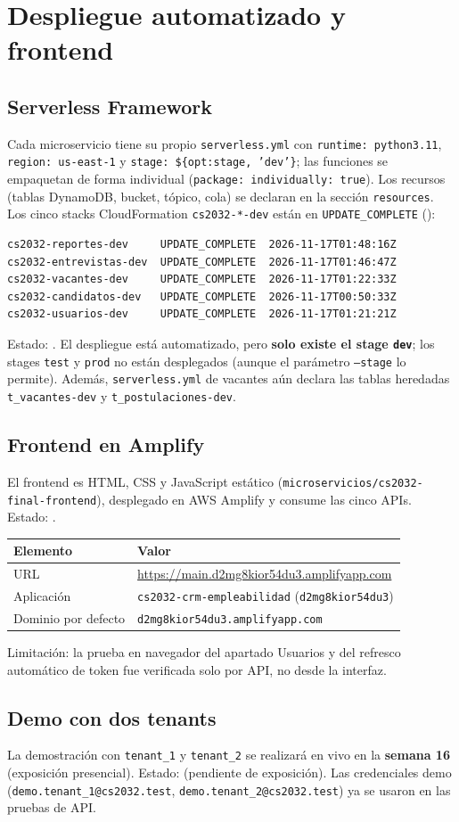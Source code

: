 \section{Despliegue automatizado y frontend}
\subsection{Serverless Framework}
Cada microservicio tiene su propio \texttt{serverless.yml} con \texttt{runtime: python3.11}, \texttt{region: us-east-1} y \texttt{stage: \$\{opt:stage, 'dev'\}}; las funciones se empaquetan de forma individual (\texttt{package: individually: true}). Los recursos (tablas DynamoDB, bucket, tópico, cola) se declaran en la sección \texttt{resources}. Los cinco stacks CloudFormation \texttt{cs2032-*-dev} están en \texttt{UPDATE\_COMPLETE} ():
\begin{lstlisting}
cs2032-reportes-dev     UPDATE_COMPLETE  2026-11-17T01:48:16Z
cs2032-entrevistas-dev  UPDATE_COMPLETE  2026-11-17T01:46:47Z
cs2032-vacantes-dev     UPDATE_COMPLETE  2026-11-17T01:22:33Z
cs2032-candidatos-dev   UPDATE_COMPLETE  2026-11-17T00:50:33Z
cs2032-usuarios-dev     UPDATE_COMPLETE  2026-11-17T01:21:21Z
\end{lstlisting}
Estado: \parcial. El despliegue está automatizado, pero \textbf{solo existe el stage \texttt{dev}}; los stages \texttt{test} y \texttt{prod} no están desplegados (aunque el parámetro \texttt{--stage} lo permite). Además, \texttt{serverless.yml} de vacantes aún declara las tablas heredadas \texttt{t\_vacantes-dev} y \texttt{t\_postulaciones-dev}.

\subsection{Frontend en Amplify}
El frontend es HTML, CSS y JavaScript estático (\texttt{microservicios/cs2032-final-frontend}), desplegado en AWS Amplify y consume las cinco APIs. Estado: \cumple.

\begin{tabular}{@{}ll@{}}
\toprule
Elemento & Valor \\
\midrule
URL & \url{https://main.d2mg8kior54du3.amplifyapp.com} \\
Aplicación & \texttt{cs2032-crm-empleabilidad} (\texttt{d2mg8kior54du3}) \\
Dominio por defecto & \texttt{d2mg8kior54du3.amplifyapp.com} \\
\bottomrule
\end{tabular}

Limitación: la prueba en navegador del apartado Usuarios y del refresco automático de token fue verificada solo por API, no desde la interfaz.

\subsection{Demo con dos tenants}
La demostración con \texttt{tenant\_1} y \texttt{tenant\_2} se realizará en vivo en la \textbf{semana 16} (exposición presencial). Estado: \parcial{} (pendiente de exposición). Las credenciales demo (\texttt{demo.tenant\_1@cs2032.test}, \texttt{demo.tenant\_2@cs2032.test}) ya se usaron en las pruebas de API.
